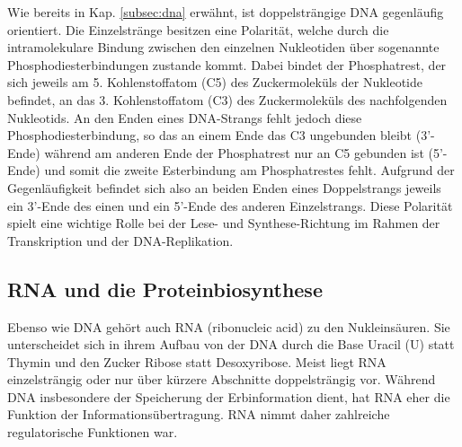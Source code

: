 Wie bereits in Kap. \ref{subsec:dna} erwähnt, ist doppelsträngige DNA gegenläufig orientiert. Die Einzelstränge besitzen eine Polarität, welche durch die intramolekulare Bindung zwischen den einzelnen Nukleotiden über sogenannte Phosphodiesterbindungen zustande kommt. Dabei bindet der Phosphatrest, der sich jeweils am 5. Kohlenstoffatom (C5) des Zuckermoleküls der Nukleotide befindet, an das 3. Kohlenstoffatom (C3) des Zuckermoleküls des nachfolgenden Nukleotids. An den Enden eines DNA-Strangs fehlt jedoch diese Phosphodiesterbindung, so das an einem Ende das C3 ungebunden bleibt (3'-Ende) während am anderen Ende der Phosphatrest nur an C5 gebunden ist (5'-Ende) und somit die zweite Esterbindung am Phosphatrestes fehlt. Aufgrund der Gegenläufigkeit befindet sich also an beiden Enden eines Doppelstrangs jeweils ein 3'-Ende des einen und ein 5'-Ende des anderen Einzelstrangs. Diese Polarität spielt eine wichtige Rolle bei der Lese- und Synthese-Richtung im Rahmen der Transkription und der DNA-Replikation.




\subsection{RNA und die Proteinbiosynthese} \label{subsec:protsynth}

Ebenso wie DNA gehört auch RNA (ribonucleic acid) zu den Nukleinsäuren. Sie unterscheidet sich in ihrem Aufbau von der DNA durch die Base Uracil (U) statt Thymin und den Zucker Ribose statt Desoxyribose. Meist liegt RNA einzelsträngig oder nur über kürzere Abschnitte doppelsträngig vor. Während DNA insbesondere der Speicherung der Erbinformation dient, hat RNA eher die Funktion der Informationsübertragung. RNA nimmt daher zahlreiche regulatorische Funktionen war. \\

